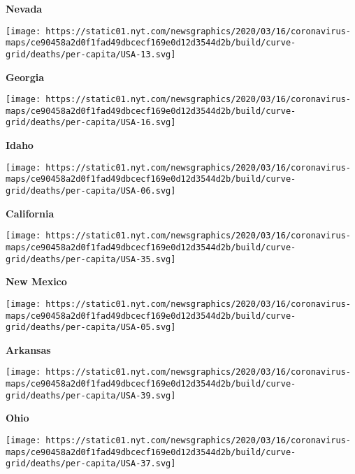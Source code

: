 \textbf{Nevada}

\href{https://www.nytimes.com/interactive/2020/us/georgia-coronavirus-cases.html}{}

\texttt{[image: https://static01.nyt.com/newsgraphics/2020/03/16/coronavirus-maps/ce90458a2d0f1fad49dbcecf169e0d12d3544d2b/build/curve-grid/deaths/per-capita/USA-13.svg]}

\textbf{Georgia}

\href{https://www.nytimes.com/interactive/2020/us/idaho-coronavirus-cases.html}{}

\texttt{[image: https://static01.nyt.com/newsgraphics/2020/03/16/coronavirus-maps/ce90458a2d0f1fad49dbcecf169e0d12d3544d2b/build/curve-grid/deaths/per-capita/USA-16.svg]}

\textbf{Idaho}

\href{https://www.nytimes.com/interactive/2020/us/california-coronavirus-cases.html}{}

\texttt{[image: https://static01.nyt.com/newsgraphics/2020/03/16/coronavirus-maps/ce90458a2d0f1fad49dbcecf169e0d12d3544d2b/build/curve-grid/deaths/per-capita/USA-06.svg]}

\textbf{California}

\href{https://www.nytimes.com/interactive/2020/us/new-mexico-coronavirus-cases.html}{}

\texttt{[image: https://static01.nyt.com/newsgraphics/2020/03/16/coronavirus-maps/ce90458a2d0f1fad49dbcecf169e0d12d3544d2b/build/curve-grid/deaths/per-capita/USA-35.svg]}

\textbf{New Mexico}

\href{https://www.nytimes.com/interactive/2020/us/arkansas-coronavirus-cases.html}{}

\texttt{[image: https://static01.nyt.com/newsgraphics/2020/03/16/coronavirus-maps/ce90458a2d0f1fad49dbcecf169e0d12d3544d2b/build/curve-grid/deaths/per-capita/USA-05.svg]}

\textbf{Arkansas}

\href{https://www.nytimes.com/interactive/2020/us/ohio-coronavirus-cases.html}{}

\texttt{[image: https://static01.nyt.com/newsgraphics/2020/03/16/coronavirus-maps/ce90458a2d0f1fad49dbcecf169e0d12d3544d2b/build/curve-grid/deaths/per-capita/USA-39.svg]}

\textbf{Ohio}

\href{https://www.nytimes.com/interactive/2020/us/north-carolina-coronavirus-cases.html}{}

\texttt{[image: https://static01.nyt.com/newsgraphics/2020/03/16/coronavirus-maps/ce90458a2d0f1fad49dbcecf169e0d12d3544d2b/build/curve-grid/deaths/per-capita/USA-37.svg]}


